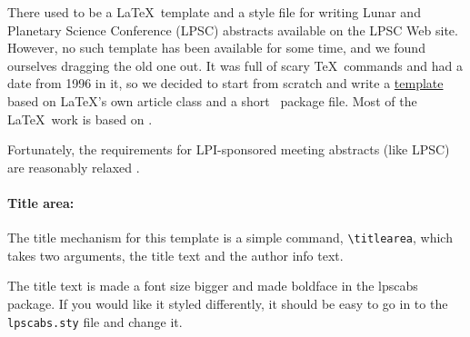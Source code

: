\documentclass[twoside]{article}
\begin{document}


%

%


There used to be a \LaTeX\ template and a style file for writing
Lunar and Planetary Science Conference (LPSC) abstracts available
on the LPSC Web site.  However, no such template has been available
for some time, and we found ourselves dragging the old one out.  It
was full of scary \TeX\ commands and had a date from 1996 in it,
so we decided to start from scratch and write a
\href{https://github.com/rbeyer/lpsc_template}{template} based
on \LaTeX's own article class and a short \LaTeXe\ package file.
Most of the \LaTeX\ work is based on \citet{latexguide}.

Fortunately, the requirements for LPI-sponsored meeting abstracts (like LPSC)
are reasonably relaxed \citep{LPSC}.

\paragraph{Title area:}

The title mechanism for this template is a simple command,
\verb=\titlearea=, which takes two arguments, the title text and the
author info text.

The title text is made a font size bigger and made boldface in the
lpscabs package.  If you would like it styled differently, it should
be easy to go in to the \texttt{lpscabs.sty} file and change it.
\end{document}
